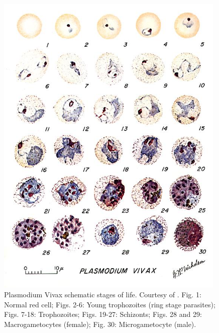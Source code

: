 \documentclass[final,a4paper,12pt,english]{UnicaPhdThesis3}
\begin{document}
\begin{figure}[!htbp]
	\centering
	\includegraphics[width=0.98\textwidth]{images/malaria_th/mal_viv}
	\caption{\label{fig:vivax_th} Plasmodium Vivax schematic stages of life. Courtesy of \cite{Med_cdc}.
		Fig. 1: Normal red cell; Figs. 2-6: Young trophozoites (ring stage parasites); Figs. 7-18: Trophozoites; Figs. 19-27: Schizonts; Figs. 28 and 29: Macrogametocytes (female); Fig. 30: Microgametocyte (male).}
\end{figure}



\ifdraft{
  \listoffixmes
}{}
\end{document}
